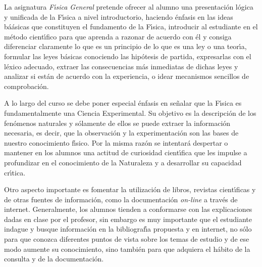 La asignatura 
 {\it F\'{\i}sica General}   pretende ofrecer al 
alumno una presentaci\'{o}n l\'{o}gica y unificada de la F\'{\i}sica 
a nivel introductorio, haciendo \'{e}nfasis  en las ideas b\'{a}ásicas
 que constituyen el fundamento de la F\'{\i}sica, introducir al 
estudiante en el m\'{e}todo cient\'{\i}fico para que aprenda
 a razonar de acuerdo con \'{e}l y consiga diferenciar  claramente
 lo que es un principio de lo que es una ley o una teor\'{\i}a, 
 formular las leyes b\'{a}sicas
 conociendo las hip\'{o}tesis de partida, expresarlas con el 
l\'{e}xico adecuado, extraer las consecuencias
 m\'{a}s inmediatas de dichas leyes y  analizar si est\'{a}n de acuerdo 
con la experiencia, o idear mecanismos sencillos de comprobaci\'{o}n. 


A lo largo del curso se debe poner especial \'{e}nfasis en
 se\~{n}alar que la F\'{\i}sica es fundamentalmente una Ciencia Experimental.
 Su objetivo es la descripci\'{o}n de los fen\'{o}menos naturales
 y s\'{o}lamente de ellos se puede 
extraer la informaci\'{o}n necesaria, es decir, que la observaci\'{o}n y
la experimentaci\'{o}n son las bases de nuestro conocimiento f\'{\i}sico.
Por la misma raz\'{o}n se intentar\'{a} despertar o mantener en 
los alumnos una actitud de curiosidad cient\'{\i}fica que les impulse
a profundizar en el conocimiento de la Naturaleza y a desarrollar 
su capacidad cr\'{\i}tica.


Otro aspecto importante es fomentar la utilizaci\'{o}n de libros, revistas
cient\'{\i}ficas y de
 otras fuentes 
 de informaci\'{o}n, como la documentaci\'{o}n {\it on-line} a
 trav\'{e}s de internet. 
Generalmente, los alumnos tienden a conformarse con las explicaciones dadas 
en clase por el profesor, sin embargo es muy importante que el estudiante
 indague    y busque informaci\'{o}n
 en la bibliograf\'{\i}a propuesta y en internet,
 no s\'{o}lo para que conozca diferentes puntos de vista sobre los 
temas de estudio 
 y de ese modo aumente su conocimiento, sino tambi\'{e}n para que adquiera 
 el h\'{a}bito de la consulta y de la documentaci\'{o}n.


